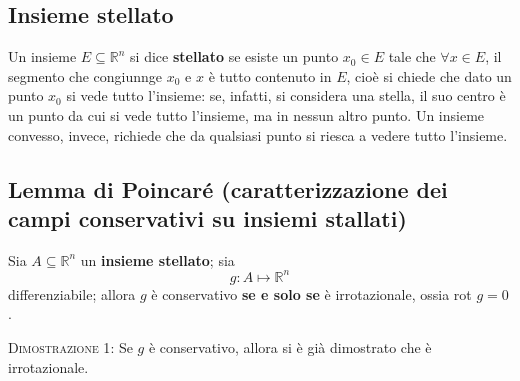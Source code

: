 \documentclass[a4paper]{extarticle}
\begin{document}
\vspace{1em}
\noindent
\subsection{Insieme stellato}
Un insieme $E \subseteq \mathbb{R}^n$ si dice \textbf{stellato} se esiste un punto $x_0 \in E$ tale che $\forall x \in E$, il segmento che congiunnge $x_0$ e $x$ è tutto contenuto in $E$, cioè si chiede che dato un punto $x_0$ si vede tutto l'insieme: se, infatti, si considera una stella, il suo centro è un punto da cui si vede tutto l'insieme, ma in nessun altro punto. Un insieme convesso, invece, richiede che da qualsiasi punto si riesca a vedere tutto l'insieme.

\vspace{1em}
\noindent
\subsection{Lemma di Poincaré (caratterizzazione dei campi conservativi su insiemi stallati)}
Sia $A \subseteq \mathbb{R}^n$ un \textbf{insieme stellato}; sia
\[g : A \longmapsto \mathbb{R}^n\]
differenziabile; allora $g$ è conservativo \textbf{se e solo se} è irrotazionale, ossia rot $g=0$.

\vspace{2em}
\noindent
\normalfont \normalsize
\textsc{Dimostrazione 1}: Se $g$ è conservativo, allora si è già dimostrato che è irrotazionale.
\end{document}
